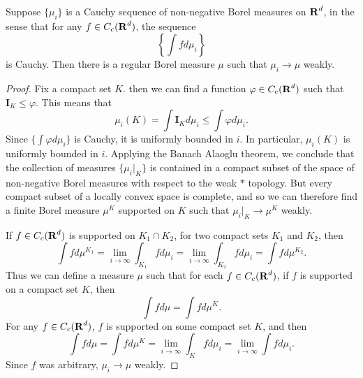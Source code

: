 \begin{lemma} \label{weakstarcompleteness}
	Suppose $\{ \mu_i \}$ is a Cauchy sequence of non-negative Borel measures on $\operatorname{\mathbf{R}}^d$, in the sense that for any $f \in C_c(\operatorname{\mathbf{R}}^d)$, the sequence
	\[ \left\{ \int f d\mu_i \right\} \]
	is Cauchy. Then there is a regular Borel measure $\mu$ such that $\mu_i \to \mu$ weakly.
\end{lemma}
\begin{proof}
	Fix a compact set $K$. then we can find a function $\varphi \in C_c(\operatorname{\mathbf{R}}^d)$ such that $\mathbf{I}_K \leq \varphi$. This means that
	\[ \mu_i(K) = \int \mathbf{I}_K d\mu_i \leq \int \varphi d\mu_i. \]
	Since $\{ \int \varphi d\mu_i \}$ is Cauchy, it is uniformly bounded in $i$. In particular, $\mu_i(K)$ is uniformly bounded in $i$. Applying the Banach Alaoglu theorem, we conclude that the collection of measures $\{ \mu_i|_K \}$ is contained in a compact subset of the space of non-negative Borel measures with respect to the weak $*$ topology. But every compact subset of a locally convex space is complete, and so we can therefore find a finite Borel measure $\mu^K$ supported on $K$ such that $\mu_i|_K \to \mu^K$ weakly.

	If $f \in C_c(\operatorname{\mathbf{R}}^d)$ is supported on $K_1 \cap K_2$, for two compact sets $K_1$ and $K_2$, then
	\[ \int f d\mu^{K_1} = \lim_{i \to \infty} \int_{K_1} f d\mu_i = \lim_{i \to \infty} \int_{K_2} f d \mu_i = \int f d\mu^{K_2}. \]
	Thus we can define a measure $\mu$ such that for each $f \in C_c(\operatorname{\mathbf{R}}^d)$, if $f$ is supported on a compact set $K$, then
	\[ \int f d\mu = \int f d\mu^K. \]
	For any $f \in C_c(\operatorname{\mathbf{R}}^d)$, $f$ is supported on some compact set $K$, and then
	\[ \int f d\mu = \int f d\mu^K = \lim_{i \to \infty} \int_K f d\mu_i = \lim_{i \to \infty} \int f d\mu_i. \]
	Since $f$ was arbitrary, $\mu_i \to \mu$ weakly.
\end{proof}

